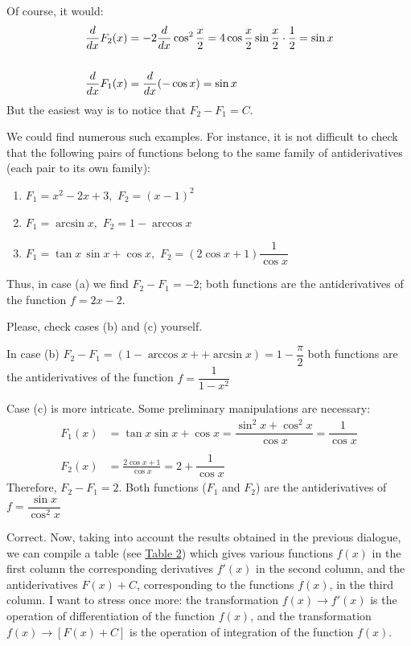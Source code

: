 \athr Of course, it would:
\begin{align*}%
\ddx F_{2} (x) & = -2 \ddx \cos^{2} \dfrac{x}{2}  = 4 \cos \dfrac{x}{2} \sin \frac{x}{2} \cdot \frac{1}{2} = \sin x\\
& \\
\ddx F_{1} (x) & = \ddx (- \cos x) = \sin x
\end{align*}
But the easiest way is to notice that $F_{2} - F_{1} = C$. 

We could find numerous such examples. For instance, it is not difficult to check that the following pairs of functions belong to the same family of antiderivatives (each pair to its own family): 
\begin{enumerate}[label=(\alph*)]
\item $F_{1} = x^{2} - 2x + 3, \,\, F_{2} = (x- 1)^{2}$
\item $F_{1} = \arcsin x, \,\, F_{2} = 1 - \arccos x $
\item $F_{1} = \tan x \, \sin x + \cos x, \,\, F_{2} = (2 \cos x + 1) \dfrac{1}{ \cos x}$
\end{enumerate}
Thus, in case (a) we find $F_{2} -	F_{1} = -2$; both functions are the antiderivatives of the function $f = 2x - 2$.

Please, check cases (b) and (c) yourself. 

\rdr In case (b)  $F_{2} - F_{1} = (1 - \arccos x +
+ \arcsin x) = 1 - \dfrac{\pi}{2}$ both functions are the antiderivatives of the function $f = \dfrac{1}{1 - x^{2}}$

Case (c) is more intricate. Some preliminary manipulations are necessary:
\begin{align*}%
F_{1} (x) & = \tan x \sin x + \cos x = \dfrac{\sin^{2} x + \cos^{2} x}{\cos x} = \dfrac{1}{\cos x}\\
& \\
F_{2} (x) & = \frac{2 \cos x + 1 }{\cos x} = 2 + \dfrac{1}{\cos x}
\end{align*}
Therefore, $F_{2} - F_{1}=2$. Both functions ($F_{1}$ and $F_{2}$) are the antiderivatives of $f = \dfrac{\sin x}{\cos^{2} x}$

\athr Correct. Now, taking into account the results obtained in the previous dialogue, we can compile a table (see  \hyperref[deriv-list]{Table 2}) which gives various functions $f (x)$ in the first column the corresponding derivatives $f' (x)$ in the second column, and the antiderivatives $F (x) + C$, corresponding to the functions $f (x)$, in the third column. I want to stress once more: the transformation $f (x) \to f' (x)$ is the operation of differentiation of the function $f(x)$, and the transformation $f (x) \to [F (x) + C]$ is the operation of integration of the function $f (x)$.

